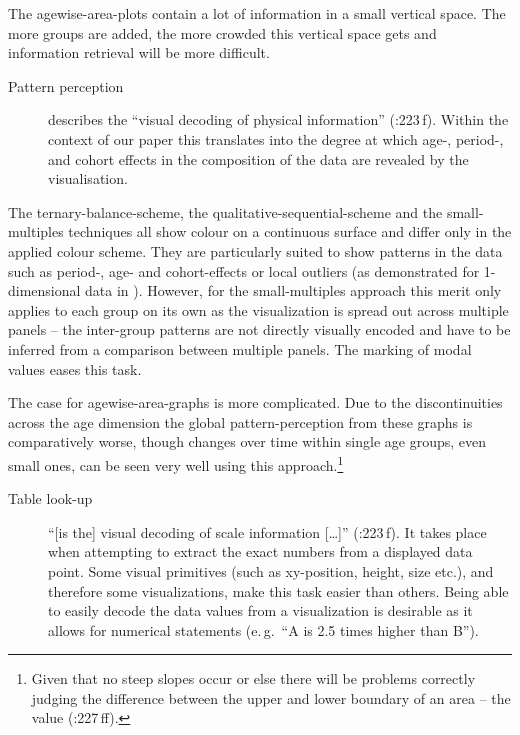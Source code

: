 \documentclass[parskip=half]{scrartcl}
\begin{document}
The agewise-area-plots contain a lot of information in a small vertical space. The more groups are added, the more crowded this vertical space gets and information retrieval will be more difficult.

\begin{description}
  \item[Pattern perception] describes the \enquote{visual decoding of physical information} (\cite{Cleveland1994}:223\,f). Within the context of our paper this translates into the degree at which age-, period-, and cohort effects in the composition of the data are revealed by the visualisation.
\end{description}

The ternary-balance-scheme, the qualitative-sequential-scheme and the small-multiples techniques all show colour on a continuous surface and differ only in the applied colour scheme. They are particularly suited to show patterns in the data such as period-, age- and cohort-effects or local outliers (as demonstrated for 1-dimensional data in \cite{Vaupel1987a}). However, for the small-multiples approach this merit only applies to each group on its own as the visualization is spread out across multiple panels -- the inter-group patterns are not directly visually encoded and have to be inferred from a comparison between multiple panels. The marking of modal values eases this task.

The case for agewise-area-graphs is more complicated. Due to the discontinuities across the age dimension the global pattern-perception from these graphs is comparatively worse, though changes over time within single age groups, even small ones, can be seen very well using this approach.\footnote{
  Given that no steep slopes occur or else there will be problems correctly judging the difference between the upper and lower boundary of an area -- the value (\cite{Cleveland1994}:227\,ff).
}

\begin{description}
  \item[Table look-up] \enquote{[is the] visual decoding of scale information [\ldots]} (\cite{Cleveland1994}:223\,f). It takes place when attempting to extract the exact numbers from a displayed data point. Some visual primitives (such as xy-position, height, size etc.), and therefore some visualizations, make this task easier than others. Being able to easily decode the data values from a visualization is desirable as it allows for numerical statements (e.\,g.~\enquote{A is 2.5 times higher than B}).
\end{description}
\end{document}

